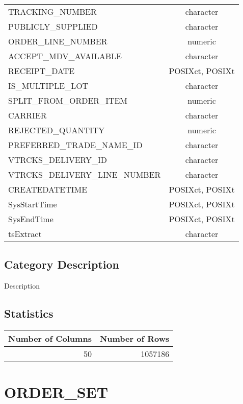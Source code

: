 \documentclass[
  letterpaper,
  DIV=11,
  numbers=noendperiod]{scrreprt}
\begin{document}
\begin{longtable}{lc}
TRACKING\_NUMBER & character \\ 
PUBLICLY\_SUPPLIED & character \\ 
ORDER\_LINE\_NUMBER & numeric \\ 
ACCEPT\_MDV\_AVAILABLE & character \\ 
RECEIPT\_DATE & POSIXct, POSIXt \\ 
IS\_MULTIPLE\_LOT & character \\ 
SPLIT\_FROM\_ORDER\_ITEM & numeric \\ 
CARRIER & character \\ 
REJECTED\_QUANTITY & numeric \\ 
PREFERRED\_TRADE\_NAME\_ID & character \\ 
VTRCKS\_DELIVERY\_ID & character \\ 
VTRCKS\_DELIVERY\_LINE\_NUMBER & character \\ 
CREATEDATETIME & POSIXct, POSIXt \\ 
SysStartTime & POSIXct, POSIXt \\ 
SysEndTime & POSIXct, POSIXt \\ 
tsExtract & character \\ 
\bottomrule
\end{longtable}

\hypertarget{category-description-21}{%
\section*{Category Description}\label{category-description-21}}

Description

\hypertarget{statistics-21}{%
\section*{Statistics}\label{statistics-21}}

\begin{longtable}{rr}
\toprule
Number of Columns & Number of Rows \\ 
\midrule
50 & 1057186 \\ 
\bottomrule
\end{longtable}

\hypertarget{order_set}{%
\chapter*{ORDER\_SET}\label{order_set}}
\end{document}
